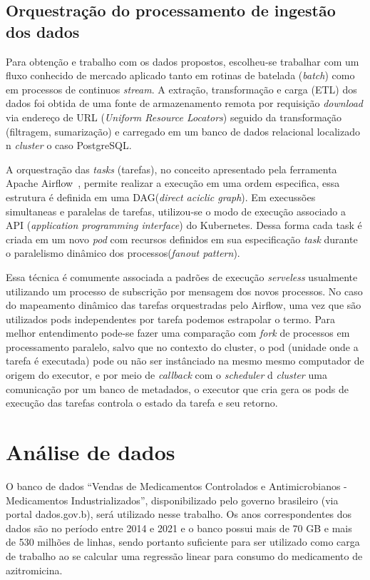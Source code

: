 \subsection{Orquestração do processamento de ingestão dos dados}

Para obtenção e trabalho com os dados propostos, escolheu-se trabalhar com um fluxo conhecido de mercado aplicado tanto em rotinas de batelada (\emph{batch}) como em processos de continuos \emph{stream}. A extração, transformação e carga (ETL) dos dados foi obtida de uma fonte de armazenamento remota por requisição \emph{download} via endereço de URL (\emph{Uniform Resource Locators}) seguido da transformação (filtragem, sumarização) e carregado em um banco de dados relacional localizado n \emph{cluster} o caso PostgreSQL\textregistered.

A orquestração das \emph{tasks} (tarefas), no conceito apresentado pela ferramenta {Apache Airflow}\textregistered \ \cite{airflowconcepts}, permite realizar a execução em uma ordem especifica, essa estrutura é definida em uma DAG(\emph{direct aciclic graph}). Em execussões simultaneas e paralelas de tarefas, utilizou-se o modo de execução associado a API (\emph{application programming interface}) do Kubernetes\textregistered. Dessa forma cada task é criada em um novo \emph{pod} com recursos definidos em sua especificação \emph{task} durante o paralelismo dinâmico dos processos(\emph{fanout pattern}).

Essa técnica é comumente associada a padrões de execução \emph{serveless} usualmente utilizando um processo de subscrição por mensagem dos novos processos. No caso do mapeamento dinâmico das tarefas orquestradas pelo Airflow, uma vez que são utilizados pods independentes por tarefa podemos estrapolar o termo. Para melhor entendimento pode-se fazer uma comparação com \emph{fork} de processos em processamento paralelo, salvo que no contexto do cluster, o pod (unidade onde a tarefa é executada) pode ou não ser instânciado na mesmo mesmo computador de origem do executor, e por meio de \emph{callback} com o \emph{scheduler} d \emph{cluster}  uma comunicação por um banco de metadados, o executor que cria gera os pods de execução das tarefas controla o estado da tarefa e seu retorno.

\section{Análise de dados}

O banco de dados “Vendas de Medicamentos Controlados e Antimicrobianos - Medicamentos Industrializados”, disponibilizado pelo governo brasileiro (via portal dados.gov.b), será utilizado nesse trabalho. Os anos correspondentes dos dados são no período entre 2014 e 2021 e o banco possui mais de 70 GB  e mais de 530 milhões de linhas, sendo portanto suficiente para ser utilizado como carga de trabalho ao se calcular uma regressão linear para consumo do medicamento de azitromicina.

